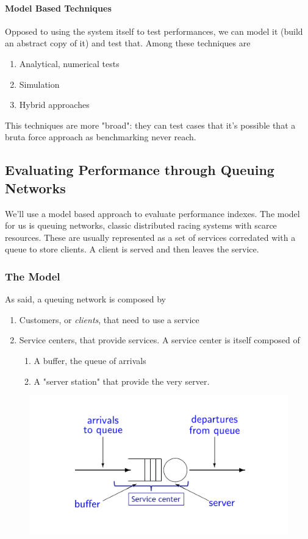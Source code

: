 \documentclass[10pt,a4paper]{article}
\begin{document}
				\paragraph{Model Based Techniques}
					Opposed to using the system itself to test performances, we can model it (build an abstract copy of it) and test that. Among these techniques are
					\begin{enumerate}
						\item Analytical, numerical tests
						\item Simulation
						\item Hybrid approaches
					\end{enumerate}
					This techniques are more "broad": they can test cases that it's possible that a bruta force approach as benchmarking never reach. 
					
			\subsection{Evaluating Performance through Queuing Networks}
				We'll use a model based approach to evaluate performance indexes. The model for us is queuing networks, classic distributed racing systems with scarce resources. These are usually represented as a set of services corredated with a queue to store clients. A client is served and then leaves the service. 
				
				\subsubsection{The Model}
					As said, a queuing network is composed by
					\begin{enumerate}
						\item Customers, or \emph{clients}, that need to use a service
						\item Service centers, that provide services. A service center is itself composed of
							\begin{enumerate}
								\item A buffer, the queue of arrivals
								\item A "server station" that provide the very server.
							\end{enumerate}
					\end{enumerate}
					\begin{figure}[H]
						\centering
						\includegraphics[width = \textwidth]{./images/queuingNetworks.png}
					\end{figure}
					
\end{document}
